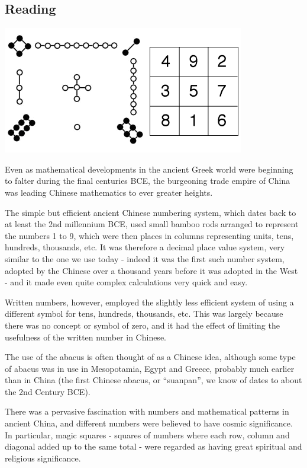 


\subsection*{Reading}
\begin{center}
  \includegraphics[width=0.5\linewidth]{chinese_magic_square}
\end{center}
Even as mathematical developments in the ancient Greek world were beginning to falter during the final centuries BCE, the burgeoning trade empire of China was leading Chinese mathematics to ever greater heights.

The simple but efficient ancient Chinese numbering system, which dates back to at least the 2nd millennium BCE, used small bamboo rods arranged to represent the numbers 1 to 9, which were then places in columns representing units, tens, hundreds, thousands, etc. It was therefore a decimal place value system, very similar to the one we use today - indeed it was the first such number system, adopted by the Chinese over a thousand years before it was adopted in the West - and it made even quite complex calculations very quick and easy.

Written numbers, however, employed the slightly less efficient system of using a different symbol for tens, hundreds, thousands, etc. This was largely because there was no concept or symbol of zero, and it had the effect of limiting the usefulness of the written number in Chinese.

The use of the abacus is often thought of as a Chinese idea, although some type of abacus was in use in Mesopotamia, Egypt and Greece, probably much earlier than in China (the first Chinese abacus, or “suanpan”, we know of dates to about the 2nd Century BCE).

There was a pervasive fascination with numbers and mathematical patterns in ancient China, and different numbers were believed to have cosmic significance. In particular, magic squares - squares of numbers where each row, column and diagonal added up to the same total - were regarded as having great spiritual and religious significance.

